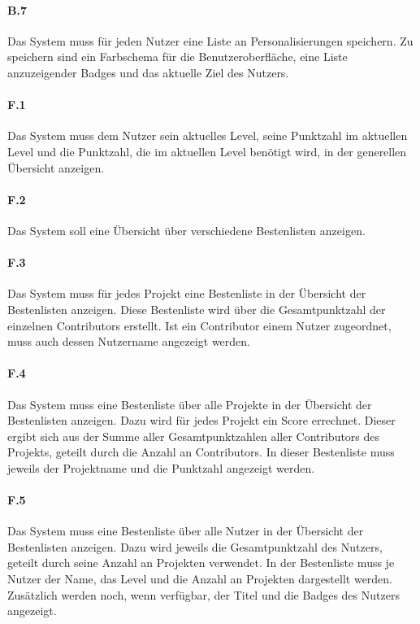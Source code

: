 \documentclass[
	oneside,  %
	ngerman, 
	final, 
	11pt, 
	a4paper, 
	1.1headlines, 
	headinclude=false, 
	footinclude=false, 
	mpinclude=false, 
	pagesize, 
	onecolumn, 
	titlepage, 
	parskip=half, 
	headsepline, 
	chapterprefix=false, 
	version=first, 
	listof=totoc, 
	bibliography=totoc, 
	toc=graduated, 
	fleqn
]{scrbook}
\begin{document}
\paragraph{B.7}
Das System muss für jeden Nutzer eine Liste an Personalisierungen speichern.
Zu speichern sind ein Farbschema für die Benutzeroberfläche, eine Liste anzuzeigender Badges und das aktuelle Ziel des Nutzers.

\paragraph{F.1}
Das System muss dem Nutzer sein aktuelles Level, seine Punktzahl im aktuellen Level und die Punktzahl, die im aktuellen Level benötigt wird, in der generellen Übersicht anzeigen.

\paragraph{F.2}
Das System soll eine Übersicht über verschiedene Bestenlisten anzeigen.

\paragraph{F.3}
Das System muss für jedes Projekt eine Bestenliste in der Übersicht der Bestenlisten anzeigen.
Diese Bestenliste wird über die Gesamtpunktzahl der einzelnen Contributors erstellt.
Ist ein Contributor einem Nutzer zugeordnet, muss auch dessen Nutzername angezeigt werden.

\paragraph{F.4}
Das System muss eine Bestenliste über alle Projekte in der Übersicht der Bestenlisten anzeigen.
Dazu wird für jedes Projekt ein Score errechnet.
Dieser ergibt sich aus der Summe aller Gesamtpunktzahlen aller Contributors des Projekts, geteilt durch die Anzahl an Contributors.
In dieser Bestenliste muss jeweils der Projektname und die Punktzahl angezeigt werden.

\paragraph{F.5}
Das System muss eine Bestenliste über alle Nutzer in der Übersicht der Bestenlisten anzeigen.
Dazu wird jeweils die Gesamtpunktzahl des Nutzers, geteilt durch seine Anzahl an Projekten verwendet.
In der Bestenliste muss je Nutzer der Name, das Level und die Anzahl an Projekten dargestellt werden.
Zusätzlich werden noch, wenn verfügbar, der Titel und die Badges des Nutzers angezeigt.
\end{document}
